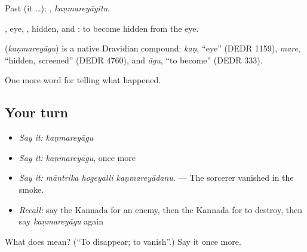 Past (it …): , \emph{kaṇmareyāyitu}.

, eye, , hidden, and : to become hidden from the eye.

\begin{cousinweb}
\textbf{} (\emph{kaṇmareyāgu}) is a native Dravidian compound: \emph{kaṇ}, \textquotedblleft{}eye\textquotedblright{} (DEDR 1159), \emph{mare}, \textquotedblleft{}hidden, screened\textquotedblright{} (DEDR 4760), and \emph{āgu}, \textquotedblleft{}to become\textquotedblright{} (DEDR 333).
\end{cousinweb}

\begin{grammarlens}[title={What you've built}]
One more word for telling what happened.
\end{grammarlens}

\subsection*{Your turn}
\begin{itemize}
\raggedright
  \item \emph{Say it:} \emph{kaṇmareyāgu}
  \item \emph{Say it:} \emph{kaṇmareyāgu}, once more
  \item \emph{Say it:} \emph{māntrika hogeyalli kaṇmareyādanu.} — The sorcerer vanished in the smoke.
  \item \emph{Recall:} say the Kannada for an enemy, then the Kannada for to destroy, then say \emph{kaṇmareyāgu} again
\end{itemize}

\begin{tcolorbox}[breakable,colback=teal!4,colframe=teal!35!black,title={Before you move on}]
What does  mean? (\textquotedblleft{}To disappear; to vanish\textquotedblright{}.) Say it once more.
\end{tcolorbox}
